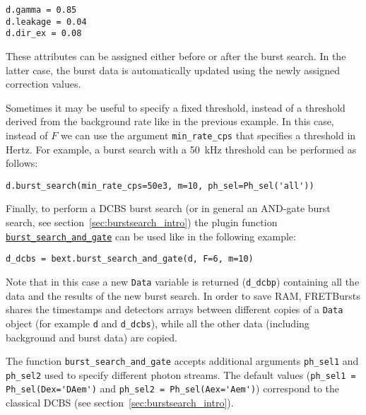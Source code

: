 \begin{verbatim}
d.gamma = 0.85
d.leakage = 0.04
d.dir_ex = 0.08
\end{verbatim}

These attributes can be assigned either before or after the burst search. In the
latter case, the burst data is
automatically updated using the newly assigned correction values.

Sometimes it may be useful to specify a fixed threshold, instead 
of a threshold derived from the background rate like in the previous example. In
this case, instead of $F$ we can use the argument \verb|min_rate_cps| that
specifies a threshold in Hertz. For example, a burst search with a 50~kHz
threshold can be performed as follows:

\begin{verbatim}
d.burst_search(min_rate_cps=50e3, m=10, ph_sel=Ph_sel('all'))
\end{verbatim}

Finally, to perform a DCBS burst search (or in general an AND-gate burst search,
see section~\ref{sec:burstsearch_intro}) the plugin function 
\href{http://fretbursts.readthedocs.org/en/latest/plugins.html#fretbursts.burstlib\_ext.burst\_search\_and\_gate}{\texttt{burst\_search\_and\_gate}}
can be used like in the following example:

\begin{verbatim}
d_dcbs = bext.burst_search_and_gate(d, F=6, m=10)
\end{verbatim}

Note that in this case a new \verb|Data| variable is returned (\verb|d_dcbp|)
containing all the data and the results of the new burst search. In order to
save RAM, FRETBursts shares the timestamps and detectors arrays between
different copies of a \verb|Data| object (for example \verb|d| and
\verb|d_dcbs|), while all the other data (including background and burst data)
are copied. 

The function \verb|burst_search_and_gate| accepts additional arguments
\verb|ph_sel1| and \verb|ph_sel2| 
used to specify different photon streams. The default values 
(\verb|ph_sel1 = Ph_sel(Dex='DAem')| and \verb|ph_sel2 = Ph_sel(Aex='Aem')|)
correspond to the classical DCBS 
(see section~\ref{sec:burstsearch_intro}).


